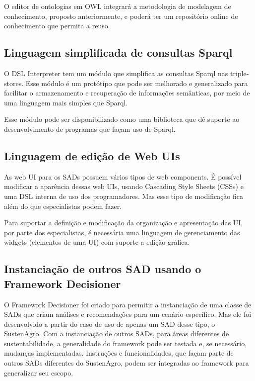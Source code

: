 O editor de ontologias em OWL integrará a metodologia de modelagem
de conhecimento, proposto anteriormente, e poderá ter um repositório
online de conhecimento que permita a reuso.

\subsection*{Linguagem simplificada de consultas Sparql}

O \foreignlanguage{english}{DSL Interpreter} tem um módulo que simplifica
as consultas Sparql nas \foreignlanguage{english}{triplestores}. Esse
módulo é um protótipo que pode ser melhorado e generalizado para facilitar
o armazenamento e recuperação de informações semânticas, por meio
de uma linguagem mais simples que Sparql. 

Esse módulo pode ser disponibilizado como uma biblioteca que dê suporte
ao desenvolvimento de programas que façam uso de Sparql. 

\subsection*{Linguagem de edição de \foreignlanguage{english}{Web UIs}}

As \foreignlanguage{english}{web UI} para os SADs possuem vários tipos
de \foreignlanguage{english}{web components}. É possível modificar
a aparência dessas web UIs, usando \foreignlanguage{english}{Cascading
Style Sheets (CSSs)} e uma DSL interna de uso dos programadores. Mas
esse tipo de modificação fica além do que especialistas podem fazer. 

Para suportar a definição e modificação da organização e apresentação
das UI, por parte dos especialistas, é necessária uma linguagem de
gerenciamento das \foreignlanguage{english}{widgets} (elementos de
uma \foreignlanguage{english}{UI}) com suporte a edição gráfica.

\subsection*{Instanciação de outros SAD usando o Framework Decisioner}

O Framework Decisioner foi criado para permitir a instanciação de
uma classe de SADs que criam análises e recomendações para um cenário
específico. Mas ele foi desenvolvido a partir do caso de uso de apenas
um SAD desse tipo, o SustenAgro. Com a instanciação de outros SADs,
para áreas diferentes de sustentabilidade, a generalidade do framework
pode ser testada e, se necessário, mudanças implementadas. Instruções
e funcionalidades, que façam parte de outros SADs diferentes do SustenAgro,
podem ser integradas ao framework para generalizar seu escopo.

